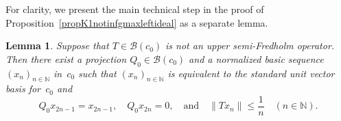 \documentclass[12pt]{amsart}
\newtheorem{lemma}[theorem]{Lemma}
\theoremstyle{definition}
\numberwithin{equation}{section}
\begin{document}
For clarity, we present the main technical step in the proof of
Proposition~\ref{propK1notinfgmaxleftideal} as a separate lemma.

\begin{lemma}\label{lemmaProj}
  Suppose that $T\in\mathscr{B}(c_0)$ is not an upper semi-Fredholm
  operator. Then there exist a projection
  \mbox{$Q_0\in\mathscr{B}(c_0)$} and a normalized basic sequence
  $(x_n)_{n\in{\ensuremath{\mathbb{N}}}}$ in~$c_0$ such that $(x_n)_{n\in{\ensuremath{\mathbb{N}}}}$ is equivalent
  to the standard unit vector basis for~$c_0$ and
  \begin{equation}\label{lemmaProjEq1}
    Q_0x_{2n-1} = x_{2n-1},\quad Q_0x_{2n} = 0,\quad
    \text{and}\quad \| 
    Tx_n\|{\ensuremath{\leqslant}}\frac{1}{n}\quad (n\in{\ensuremath{\mathbb{N}}}). \end{equation}
\end{lemma}
\end{document}
